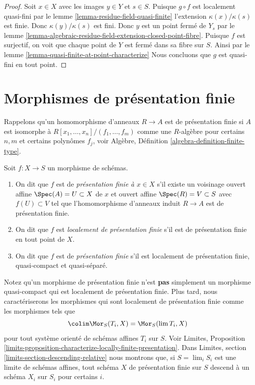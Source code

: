 \begin{proof}
Soit $x \in X$ avec les images $y \in Y$ et
$s \in S$. Puisque $g \circ f$ est localement
quasi-fini par le lemme \ref{lemma-residue-field-quasi-finite}
l'extension $\kappa(x)/\kappa(s)$ est finie.
Donc $\kappa(y)/\kappa(s)$ est fini. Donc $y$
est un point fermé de $Y_s$
par le lemme \ref{lemma-algebraic-residue-field-extension-closed-point-fibre}. Puisque $f$ est surjectif,
on voit que chaque point de $Y$ est fermé
dans sa fibre sur $S$.
Ainsi par le lemme \ref{lemma-quasi-finite-at-point-characterize} Nous concluons
que $g$ est quasi-fini en tout point.
\end{proof}














\section{Morphismes de présentation finie}
\label{section-finite-presentation}

\noindent
Rappelons qu'un homomorphisme d'anneaux $R \to A$ est de présentation
finie si $A$ est isomorphe à $R[x_1, \ldots, x_n]/(f_1, \ldots, f_m)$ comme une
$R$-algèbre pour certains $n, m$ et certains polynômes
$f_j$, voir Algèbre, Définition \ref{algebra-definition-finite-type}.

\begin{definition}
\label{definition-finite-presentation}
Soit $f : X \to S$ un morphisme de schémas.
\begin{enumerate}
\item On dit que $f$ est de {\it présentation finie
à $x \in X$} s'il existe un voisinage ouvert affine $\Spec(A) = U \subset X$
de $x$ et ouvert affine $\Spec(R) = V \subset S$ avec
$f(U) \subset V$ tel que l'homomorphisme d'anneaux induit
$R \to A$ est de présentation finie.
\item On dit que $f$ est {\it localement de présentation finie}
s'il est de présentation finie en tout point de $X$.
\item On dit que $f$ est de {\it présentation finie} s'il est
localement de présentation finie, quasi-compact et quasi-séparé.
\end{enumerate}
\end{definition}

\noindent
Notez qu'un morphisme de présentation finie n'est {\bf pas} simplement
un morphisme quasi-compact qui est localement de présentation
finie. Plus tard, nous caractériserons les morphismes
qui sont localement de présentation finie comme les morphismes tels que
$$
\colim \Mor_S(T_i, X) = \Mor_S(\lim T_i, X)
$$
pour tout système orienté de schémas affines $T_i$ sur
$S$.
Voir Limites, Proposition \ref{limits-proposition-characterize-locally-finite-presentation}. Dans Limites, section \ref{limits-section-descending-relative}
nous montrons que, si $S = \lim_i S_i$ est une limite de schémas
affines, tout schéma $X$ de présentation finie
sur $S$ descend à un schéma $X_i$ sur $S_i$
pour certains $i$.

